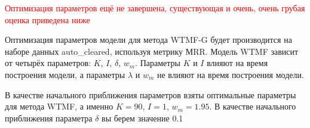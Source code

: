 %







    \textcolor{red}{Оптимизация параметров ещё не завершена, существующая и очень, очень грубая оценка приведена ниже}

    Оптимизация параметров модели для метода WTMF-G будет производится на наборе данных auto\_cleared, используя метрику МRR.
    Модель WTMF зависит от четырёх параметров: $K$, $I$, $\delta$, $w_m$.
    Параметры $K$ и $I$ влияют на время построения модели, а параметры $\lambda$ и $w_m$ не влияют на время построения модели.

    В качестве начального приближения параметров взяты оптимальные параметры для метода WTMF, а именно $K=90$, $I=1$, $w_m=1.95$.
    В качестве начального приближения параметра $\delta$ вы берем значение 0.1


